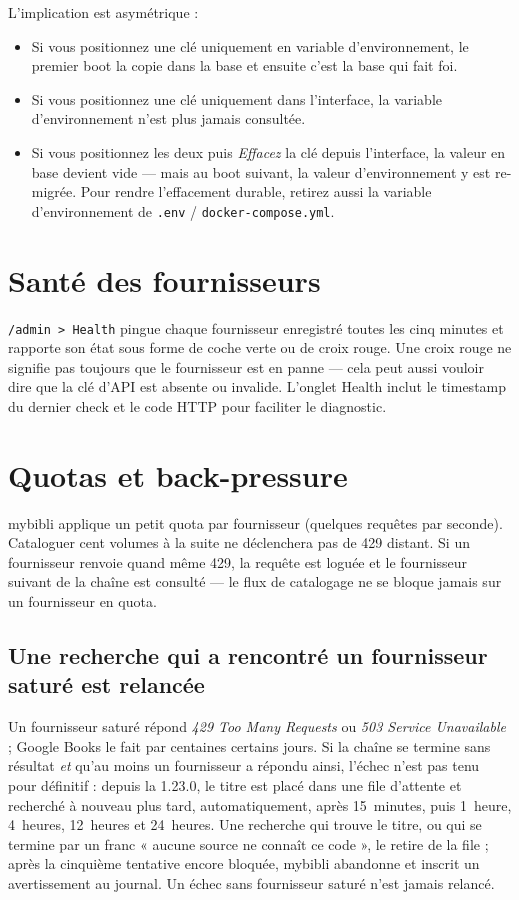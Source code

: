 L'implication est asymétrique :

\begin{itemize}
  \item Si vous positionnez une clé uniquement en variable
        d'environnement, le premier boot la copie dans la base et
        ensuite c'est la base qui fait foi.
  \item Si vous positionnez une clé uniquement dans l'interface,
        la variable d'environnement n'est plus jamais consultée.
  \item Si vous positionnez les deux puis \emph{Effacez} la clé
        depuis l'interface, la valeur en base devient vide — mais
        au boot suivant, la valeur d'environnement y est
        re-migrée. Pour rendre l'effacement durable, retirez
        aussi la variable d'environnement de \texttt{.env} /
        \texttt{docker-compose.yml}.
\end{itemize}

\section{Santé des fournisseurs}

\texttt{/admin > Health} pingue chaque fournisseur enregistré toutes
les cinq minutes et rapporte son état sous forme de coche verte ou
de croix rouge. Une croix rouge ne signifie pas toujours que le
fournisseur est en panne — cela peut aussi vouloir dire que la clé
d'API est absente ou invalide. L'onglet Health inclut le timestamp
du dernier check et le code HTTP pour faciliter le diagnostic.

\section{Quotas et back-pressure}

mybibli applique un petit quota par fournisseur (quelques requêtes
par seconde). Cataloguer cent volumes à la suite ne déclenchera pas
de 429 distant. Si un fournisseur renvoie quand même 429, la
requête est loguée et le fournisseur suivant de la chaîne est
consulté — le flux de catalogage ne se bloque jamais sur un
fournisseur en quota.

\subsection*{Une recherche qui a rencontré un fournisseur saturé est relancée}

Un fournisseur saturé répond \emph{429 Too Many Requests} ou \emph{503
Service Unavailable} ; Google Books le fait par centaines certains
jours. Si la chaîne se termine sans résultat \emph{et} qu'au moins un
fournisseur a répondu ainsi, l'échec n'est pas tenu pour définitif :
depuis la 1.23.0, le titre est placé dans une file d'attente et
recherché à nouveau plus tard, automatiquement, après 15~minutes, puis
1~heure, 4~heures, 12~heures et 24~heures. Une recherche qui trouve le
titre, ou qui se termine par un franc « aucune source ne connaît ce
code », le retire de la file ; après la cinquième tentative encore
bloquée, mybibli abandonne et inscrit un avertissement au journal. Un
échec sans fournisseur saturé n'est jamais relancé.

